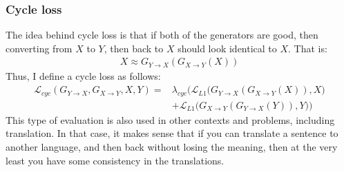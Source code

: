 \subsubsection{Cycle loss}
The idea behind cycle loss is that if both of the generators are good, then converting from $X$ to $Y$, then back to $X$ should look identical to $X$. That is:
\begin{align*}
  X \approx G_{Y\rightarrow X}(G_{X\rightarrow Y}(X))
\end{align*}
Thus, I define a cycle loss as follows:
\begin{align}
  \mathcal{L}_{cyc}(G_{Y\rightarrow X}, G_{X\rightarrow Y}, X, Y) =& \lambda_{cyc} \bigg(\mathcal{L}_{L1}\big( G_{Y\rightarrow X}(G_{X\rightarrow Y}(X)), X\big)\nonumber\\
  &+ \mathcal{L}_{L1}\big( G_{X\rightarrow Y}(G_{Y\rightarrow X}(Y)), Y\big)\bigg)\label{eq:cyclambda}
\end{align}
This type of evaluation is also used in other contexts and problems, including translation. In that case, it makes sense that if you can translate a sentence to another language, and then back without losing the meaning, then at the very least you have some consistency in the translations.
